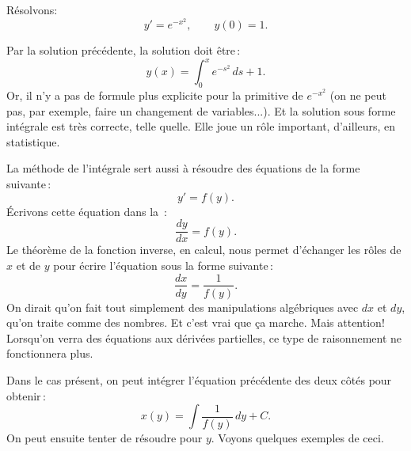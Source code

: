 \begin{example}
Résolvons:
\begin{equation*}
	y' = e^{-x^2}, \qquad y(0) = 1 .
\end{equation*}

Par la solution précédente, la solution doit être\,:  
\begin{equation*}
y(x) = \int_0^x e^{-s^2} \,ds + 1 .
\end{equation*}
Or, il n'y a pas de formule plus explicite pour la primitive de $e^{-x^2}$  (on ne peut pas, par exemple, faire un changement de variables...).  Et la solution sous forme intégrale est très correcte, telle quelle.  Elle joue un rôle important, d'ailleurs, en statistique.
\end{example}

La méthode de l'intégrale sert aussi à résoudre des équations de la forme suivante\,: 
\begin{equation*}
y' = f(y) .
\end{equation*}
Écrivons cette équation dans la \,: 
\begin{equation*}
\frac{dy}{dx} = f(y) .
\end{equation*}
Le théorème de la fonction inverse, en calcul, nous permet d'échanger les rôles de $x$ et de $y$ pour écrire l'équation sous la forme suivante\,: 
\begin{equation*}
	\frac{dx}{dy} = \frac{1}{f(y)} .
\end{equation*}
On dirait qu'on fait tout simplement des manipulations algébriques avec $dx$ et $dy$, qu'on traite comme des nombres.  Et c'est vrai que ça marche.  Mais attention! Lorsqu'on verra des équations aux dérivées partielles, ce type de raisonnement ne fonctionnera plus.

Dans le cas présent, on peut intégrer l'équation précédente des deux côtés pour obtenir\,: 
\begin{equation*}
	x(y) = \int \frac{1}{f(y)} \,dy + C .
\end{equation*}
On peut ensuite tenter de résoudre pour $y$.  Voyons quelques exemples de ceci.

